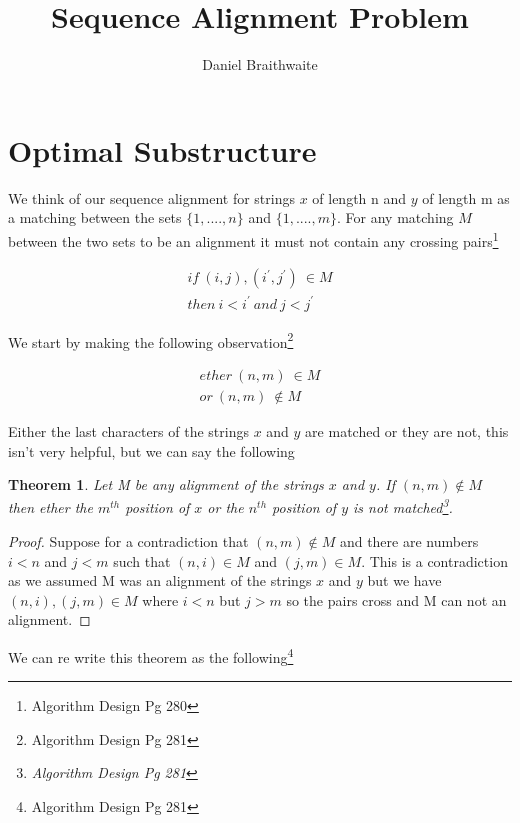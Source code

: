 \documentclass{article}
\title{Sequence Alignment Problem}
\author{Daniel Braithwaite}
\newtheorem{thm}{Theorem}
\begin{document}
	\maketitle
	\newpage
  	
  	\section{Optimal Substructure}
  		We think of our sequence alignment for strings $x$ of length n and $y$ of length m as a matching between the sets $\{1,....,n\}$ and $\{1,....,m\}$. For any matching $M$ between the two sets to be an alignment it must not contain any crossing pairs\footnote{Algorithm Design Pg 280}
  		
		\begin{align*}
  			if\ (i,j),(i^\prime, j^\prime)\  \in M\\
  			then\ i < i^\prime\ and\ j < j^\prime
  		\end{align*}  		
  		
		We start by making the following observation\footnote{Algorithm Design Pg 281}
		
		\begin{align*}
			ether\ (n, m)\ \in M\\
			or\ (n, m)\ \not\in M
		\end{align*}		 	
		
		Either the last characters of the strings $x$ and $y$ are matched or they are not, this isn't very helpful, but we can say the following
		
		\begin{thm}
				Let M be any alignment of the strings $x$ and $y$.
				If $(n,m) \not\in M$ then ether the $m^{th}$ position of $x$ or the $n^{th}$ position of $y$ is not matched\footnote{Algorithm Design Pg 281}.
		\end{thm}
		
		\begin{proof}
			Suppose for a contradiction that $(n,m) \not\in M$ and there are numbers $i < n$ and $j < m$ such that $(n,i) \in M$ and $(j, m) \in M$. This is a contradiction as we assumed M was an alignment of the strings $x$ and $y$ but we have $(n,i),(j,m) \in M$ where $i < n$ but $j > m$ so the pairs cross and M can not an alignment.
		\end{proof}
		
		We can re write this theorem as the following\footnote{Algorithm Design Pg 281}
		
\end{document}
